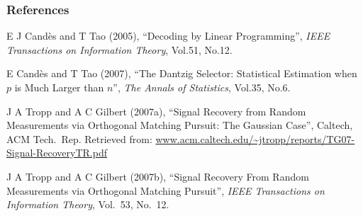 \documentclass{beamer}
\newcommand{\I}{\item}
\begin{document}
\begin{frame}
\frametitle{References}
\begin{enumerate}
{ \small
\I E J Cand\`es and T Tao (2005), ``Decoding by Linear Programming'', \textit{IEEE Transactions on Information Theory}, Vol.51, No.12.
\I E Cand\`es and T Tao (2007), ``The Dantzig Selector: Statistical Estimation when \(p\) is Much Larger than \(n\)'', \textit{The Annals of Statistics}, Vol.35, No.6.
\I J A Tropp and A C Gilbert (2007a), ``Signal Recovery from Random Measurements via Orthogonal Matching Pursuit: The Gaussian Case'', Caltech, ACM Tech.\ Rep. Retrieved from: \url{www.acm.caltech.edu/~jtropp/reports/TG07-Signal-RecoveryTR.pdf}
\I J A Tropp and A C Gilbert (2007b), ``Signal Recovery From Random Measurements via Orthogonal Matching Pursuit'', \textit{IEEE Transactions on Information Theory}, Vol.\ 53, No.\ 12.
}
\end{enumerate}
\end{frame}


\end{document}
